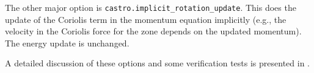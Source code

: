 The other major option is {\tt castro.implicit\_rotation\_update}.
This does the update of the Coriolis term in the momentum equation
implicitly (e.g., the velocity in the Coriolis force for the zone
depends on the updated momentum).  The energy update is unchanged.

A detailed discussion of these options and some verification 
tests is presented in \cite{katz:2016}.

